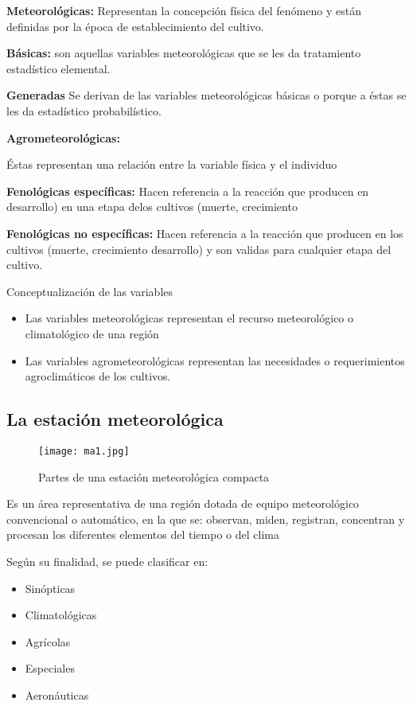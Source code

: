 \textbf{Meteorológicas:} Representan la concepción física del fenómeno y están definidas por la época de establecimiento del cultivo.

\textbf{Básicas:} son aquellas variables meteorológicas que se les da tratamiento estadístico elemental. 

\textbf{Generadas} Se derivan de las variables meteorológicas básicas o porque a éstas se les da estadístico probabilístico.

\textbf{Agrometeorológicas:}

Éstas representan una relación entre la variable física y el individuo

\textbf{Fenológicas específicas:} Hacen referencia a la reacción que producen en desarrollo) en una etapa delos cultivos (muerte, crecimiento

\textbf{Fenológicas no específicas:} Hacen referencia a la reacción que producen en los cultivos (muerte, crecimiento desarrollo) y son validas para cualquier etapa del cultivo.

Conceptualización de las variables
\begin{itemize}
    \item Las variables meteorológicas representan el recurso meteorológico o climatológico de una región
    \item Las variables agrometeorológicas representan las necesidades o requerimientos agroclimáticos de los cultivos.
\end{itemize}

\subsection{La estación meteorológica}

\begin{figure}[h!]
\centering
  \texttt{[image: ma1.jpg]}
  \caption{Partes de una estación meteorológica compacta}
  \label{ma1}
\end{figure}

\begin{definition}
    Es un área representativa de una región dotada de equipo meteorológico convencional o automático, en la que se: observan, miden, registran, concentran y procesan los diferentes elementos del tiempo o del clima
\end{definition}

Según su finalidad, se puede clasificar en:
\begin{itemize}
    \item Sinópticas
    \item Climatológicas
    \item Agrícolas
    \item Especiales
    \item Aeronáuticas
\end{itemize}

